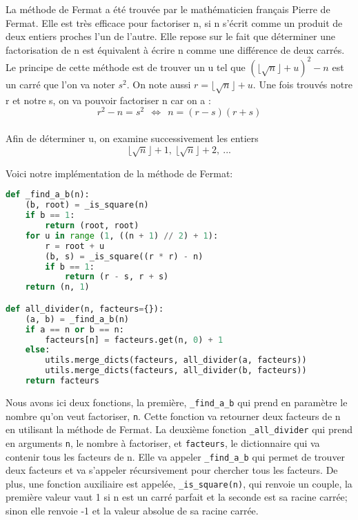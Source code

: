 La méthode de Fermat a été trouvée par le mathématicien français Pierre de Fermat.
Elle est très efficace pour factoriser n, si n s’écrit comme un produit de deux entiers proches l’un de l’autre.
Elle repose sur le fait que déterminer une factorisation de n est équivalent à écrire n comme une différence de deux carrés. \\

Le principe de cette méthode est de trouver un u tel que $(\lfloor \sqrt{n} \rfloor + u) ^ 2 - n$ 
est un carré que l’on va noter $s^2$. 
On note aussi $r = \lfloor \sqrt{n} \rfloor + u$.
Une fois trouvés notre r et notre s, on va pouvoir factoriser n car on a :
       \[r^2 - n = s^2 ~~ \Leftrightarrow ~~ n = (r - s) (r + s)\] \\
Afin de déterminer u, on examine successivement les entiers 
\[\lfloor \sqrt{n} \rfloor + 1, ~ \lfloor \sqrt{n} \rfloor + 2, ~ ...\]

Voici notre implémentation de la méthode de Fermat:
\begin{lstlisting}[language=Python]
def _find_a_b(n): 
    (b, root) = _is_square(n)
    if b == 1: 
        return (root, root)
    for u in range (1, ((n + 1) // 2) + 1):
        r = root + u
        (b, s) = _is_square((r * r) - n)
        if b == 1: 
            return (r - s, r + s)
    return (n, 1)

def all_divider(n, facteurs={}):
    (a, b) = _find_a_b(n)
    if a == n or b == n:
        facteurs[n] = facteurs.get(n, 0) + 1
    else:
        utils.merge_dicts(facteurs, all_divider(a, facteurs))
        utils.merge_dicts(facteurs, all_divider(b, facteurs))
    return facteurs
\end{lstlisting}
\vspace{1em}

\newpage
Nous avons ici deux fonctions, la première, \lstinline{_find_a_b} qui prend en paramètre le nombre qu'on veut factoriser, \lstinline{n}. 
Cette fonction va retourner deux facteurs de n en utilisant la méthode de Fermat.
La deuxième fonction \lstinline{_all_divider} qui prend en arguments \lstinline{n}, le nombre à factoriser, et \lstinline{facteurs}, le dictionnaire qui va contenir tous les facteurs de n. Elle va appeler \lstinline{_find_a_b} qui permet de trouver deux facteurs et va s'appeler récursivement pour chercher tous les facteurs.
De plus, une fonction auxiliaire est appelée, \lstinline{_is_square(n)}, qui renvoie un couple, la première valeur vaut 1 si n est un carré parfait et la seconde est sa racine carrée; sinon elle renvoie -1 et la valeur absolue de sa racine carrée.

